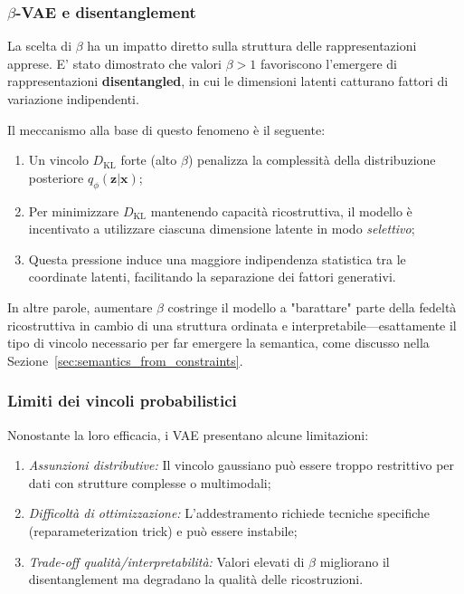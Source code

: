 \subsubsection{$\beta$-VAE e disentanglement}

La scelta di $\beta$ ha un impatto diretto sulla struttura delle rappresentazioni apprese. E' stato \parencite{burgess2018understandingdisentanglingbetavae} dimostrato che valori $\beta > 1$ favoriscono l'emergere di rappresentazioni \textbf{disentangled}, in cui le dimensioni latenti catturano fattori di variazione indipendenti.

Il meccanismo alla base di questo fenomeno è il seguente:
\begin{enumerate}
    \item Un vincolo $D_{\mathrm{KL}}$ forte (alto $\beta$) penalizza la complessità della distribuzione posteriore $q_\phi(\mathbf{z}|\mathbf{x})$;
    \item Per minimizzare $D_{\mathrm{KL}}$ mantenendo capacità ricostruttiva, il modello è incentivato a utilizzare ciascuna dimensione latente in modo \textit{selettivo};
    \item Questa pressione induce una maggiore indipendenza statistica tra le coordinate latenti, facilitando la separazione dei fattori generativi.
\end{enumerate}

In altre parole, aumentare $\beta$ costringe il modello a "barattare" parte della fedeltà ricostruttiva in cambio di una struttura ordinata e interpretabile—esattamente il tipo di vincolo necessario per far emergere la semantica, come discusso nella Sezione~\ref{sec:semantics_from_constraints}.

\subsubsection{Limiti dei vincoli probabilistici}

Nonostante la loro efficacia, i VAE presentano alcune limitazioni:
\begin{enumerate}[label=\roman*.]
    \item \textit{Assunzioni distributive:} Il vincolo gaussiano può essere troppo restrittivo per dati con strutture complesse o multimodali;
    \item \textit{Difficoltà di ottimizzazione:} L'addestramento richiede tecniche specifiche (reparameterization trick) e può essere instabile;
    \item \textit{Trade-off qualità/interpretabilità:} Valori elevati di $\beta$ migliorano il disentanglement ma degradano la qualità delle ricostruzioni.
\end{enumerate}

